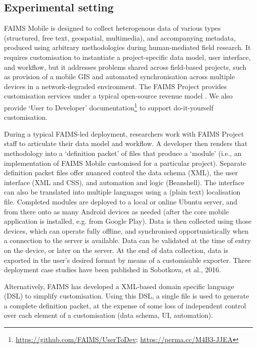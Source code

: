 \documentclass[preprint,12pt, a4paper]{elsarticle}
\begin{document}
\subsection{Experimental setting}


FAIMS Mobile is designed to collect heterogenous data of various types (structured, free text, geospatial, multimedia), and accompanying metadata, produced using arbitrary methodologies during human-mediated field research. It requires customisation to instantiate a project-specific data model, user interface, and workflow, but it addresses problems shared across field-based projects, such as provision of a mobile GIS and automated synchronisation across multiple devices in a network-degraded environment. The FAIMS Project provides customisation services under a typical open-source revenue model \cite{Kelly2008-sb}. We also provide `User to Developer' documentation\footnote{\url{https://github.com/FAIMS/UserToDev}; \url{https://perma.cc/M4B3-JJEA}}  to support do-it-yourself customisation.

During a typical FAIMS-led deployment, researchers work with FAIMS Project staff to articulate their data model and workflow. A developer then renders that methodology into a `definition packet' of files that produce a `module' (i.e., an implementation of FAIMS Mobile customised for a particular project). Separate definition packet files offer nuanced control the data schema (XML), the user interface (XML and CSS), and automation and logic (Beanshell). The interface can also be translated into multiple languages using a (plain text) localisation file. Completed modules are deployed to a local or online Ubuntu server, and from there onto as many Android devices as needed (after the core mobile application is installed, e.g. from Google Play). Data is then collected using those devices, which can operate fully offline, and synchronised opportunistically when a connection to the server is available. Data can be validated at the time of entry on the device, or later on the server. At the end of data collection, data is exported in the user's desired format by means of a customisable exporter. Three deployment case studies have been published in Sobotkova, et al., 2016\cite{Sobotkova2016-mx}.

Alternatively, FAIMS has developed a XML-based domain specific language (DSL) to simplify customisation. Using this DSL, a single file is used to generate a complete definition packet, at the expense of some loss of independent control over each element of a customisation (data schema, UI, automation). 
\end{document}
